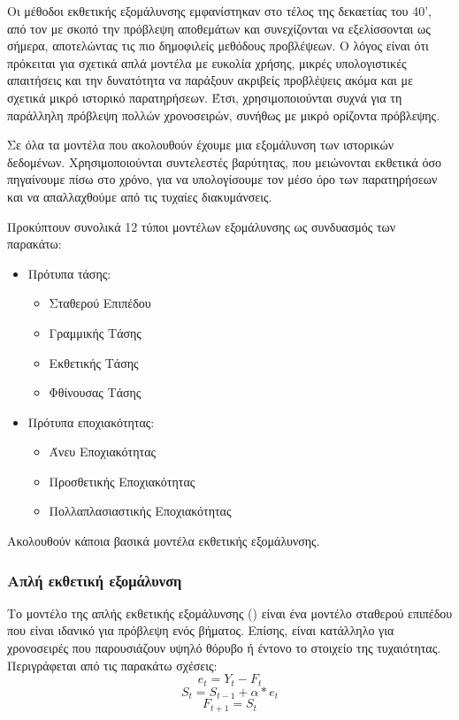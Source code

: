 Οι μέθοδοι εκθετικής εξομάλυνσης εμφανίστηκαν στο τέλος της δεκαετίας του 40', από τον  με σκοπό την πρόβλεψη αποθεμάτων και συνεχίζονται να εξελίσσονται ως σήμερα, αποτελώντας τις πιο δημοφιλείς μεθόδους προβλέψεων. Ο λόγος είναι ότι πρόκειται για σχετικά απλά μοντέλα με ευκολία χρήσης, μικρές υπολογιστικές απαιτήσεις και την δυνατότητα να παράξουν ακριβείς προβλέψεις ακόμα και με σχετικά μικρό ιστορικό παρατηρήσεων. Έτσι, χρησιμοποιούνται συχνά για τη παράλληλη πρόβλεψη πολλών χρονοσειρών, συνήθως με μικρό ορίζοντα πρόβλεψης. 

Σε όλα τα μοντέλα που ακολουθούν έχουμε μια εξομάλυνση των ιστορικών δεδομένων. Χρησιμοποιούνται συντελεστές βαρύτητας, που μειώνονται εκθετικά όσο πηγαίνουμε πίσω στο χρόνο, για να υπολογίσουμε τον μέσο όρο των παρατηρήσεων και να απαλλαχθούμε από τις τυχαίες διακυμάνσεις.

Προκύπτουν συνολικά 12 τύποι μοντέλων εξομάλυνσης ως συνδυασμός των παρακάτω:

\begin{itemize}
  \item Πρότυπα τάσης:

    \begin{itemize}
      \item Σταθερού Επιπέδου
      \item Γραμμικής Τάσης
      \item Εκθετικής Τάσης
      \item Φθίνουσας Τάσης
    \end{itemize}
  \item Πρότυπα εποχιακότητας:

    \begin{itemize}
      \item Άνευ Εποχιακότητας
      \item Προσθετικής Εποχιακότητας
      \item Πολλαπλασιαστικής Εποχιακότητας
    \end{itemize}
\end{itemize}

Ακολουθούν κάποια βασικά μοντέλα εκθετικής εξομάλυνσης.


\subsubsection{Απλή εκθετική εξομάλυνση}

Το μοντέλο της απλής εκθετικής εξομάλυνσης () είναι ένα μοντέλο σταθερού επιπέδου που είναι ιδανικό για πρόβλεψη ενός βήματος. Επίσης, είναι κατάλληλο για χρονοσειρές που παρουσιάζουν υψηλό θόρυβο ή έντονο το στοιχείο της τυχαιότητας. Περιγράφεται από τις παρακάτω σχέσεις:
\[ e_t = Y_t - F_t \]
\[ S_t = S_{t-1} + \alpha * e_t \]
\[ F_{t+1} = S_t \]


